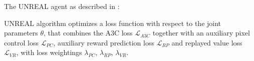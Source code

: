 \documentclass{../main.tex}{}
\begin{document}
The UNREAL agent as described in \citep{Jaderberg2016}:

UNREAL algorithm optimizes a loss function with respect to the joint parameters $\theta$, that combines the A3C loss $\mathcal{L}_{A3C}$ together with an auxiliary pixel control loss $\mathcal{L}_{PC}$, auxiliary reward prediction loss $\mathcal{L}_{RP}$ and replayed value loss $\mathcal{L}_{VR}$, with loss weightings $\lambda_{PC}$, $\lambda_{RP}$, $\lambda_{VR}$.


\end{document}

